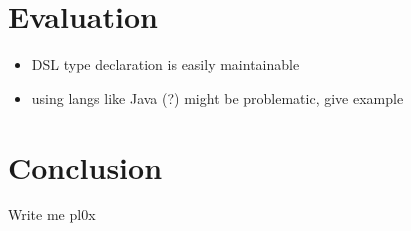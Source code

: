 \documentclass[oribibl]{llncs}
\begin{document}
\section{Evaluation}
\label{sec:evaluation}

\begin{itemize}
\item DSL type declaration is easily maintainable
\item using langs like Java (?) might be problematic, give example
\end{itemize}


\section{Conclusion}
\label{sec:conclusion}
Write me pl0x

\newpage
\nocite{*}


\end{document}
